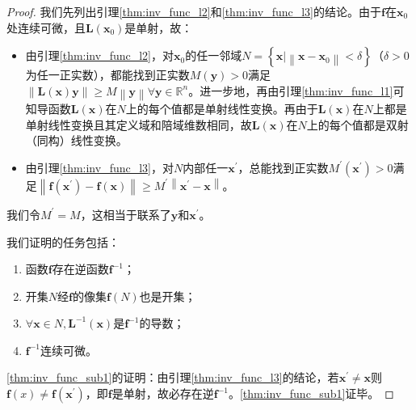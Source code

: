 \documentclass[main.tex]{subfiles}
\begin{document}
\begin{proof}
我们先列出引理\ref{thm:inv_func_l2}和\ref{thm:inv_func_l3}的结论。由于$\mathbf{f}$在$\mathbf{x}_0$处连续可微，且$\mathbf{L}\left(\mathbf{x}_0\right)$是单射，故：
\begin{itemize}
    \item 由引理\ref{thm:inv_func_l2}，对$\mathbf{x}_0$的任一邻域$N=\left\{\mathbf{x}|\left\|\mathbf{x}-\mathbf{x}_0\right\|<\delta\right\}$（$\delta>0$为任一正实数），都能找到正实数$M\left(\mathbf{y}\right)>0$满足$\left\|\mathbf{L}\left(\mathbf{x}\right)\mathbf{y}\right\|\geq M\left\|\mathbf{y}\right\|\forall\mathbf{y}\in\mathbb{R}^n$。进一步地，再由引理\ref{thm:inv_func_l1}可知导函数$\mathbf{L}\left(\mathbf{x}\right)$在$N$上的每个值都是单射线性变换。再由于$\mathbf{L}\left(\mathbf{x}\right)$在$N$上都是单射线性变换且其定义域和陪域维数相同，故$\mathbf{L}\left(\mathbf{x}\right)$在$N$上的每个值都是双射（同构）线性变换。
    \item 由引理\ref{thm:inv_func_l3}，对$N$内部任一$\mathbf{x}^\prime$，总能找到正实数$M^\prime\left(\mathbf{x}^\prime\right)>0$满足$\left\|\mathbf{f}\left(\mathbf{x}^\prime\right)-\mathbf{f}\left(\mathbf{x}\right)\right\|\geq M^\prime\left\|\mathbf{x}^\prime-\mathbf{x}\right\|$。
\end{itemize}
我们令$M^\prime=M$，这相当于联系了$\mathbf{y}$和$\mathbf{x}^\prime$。

我们证明的任务包括：
\begin{enumerate}[label=\Roman*]
    \item\label{thm:inv_func_sub1} 函数$\mathbf{f}$存在逆函数$\mathbf{f}^{-1}$；
    \item\label{thm:inv_func_sub2} 开集$N$经$\mathbf{f}$的像集$\mathbf{f}\left(N\right)$也是开集；
    \item\label{thm:inv_func_sub3} $\forall \mathbf{x}\in N,\mathbf{L}^{-1}\left(\mathbf{x}\right)$是$\mathbf{f}^{-1}$的导数；
    \item\label{thm:inv_func_sub4} $\mathbf{f}^{-1}$连续可微。
\end{enumerate}

\ref{thm:inv_func_sub1}的证明：由引理\ref{thm:inv_func_l3}的结论，若$\mathbf{x}^\prime\neq\mathbf{x}$则$\mathbf{f}\left(x\right)\neq\mathbf{f}\left(\mathbf{x}^\prime\right)$，即$\mathbf{f}$是单射，故必存在逆$\mathbf{f}^{-1}$。\ref{thm:inv_func_sub1}证毕。


\end{proof}
\end{document}
